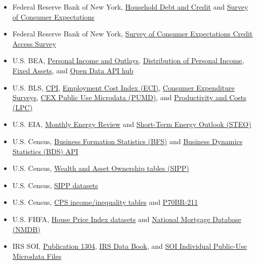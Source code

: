 \documentclass[11pt,openany]{book}
\begin{document}
\begin{itemize}
  \item Federal Reserve Bank of New York, \href{https://www.newyorkfed.org/microeconomics/hhdc}{Household Debt and Credit} and \href{https://www.newyorkfed.org/microeconomics/sce}{Survey of Consumer Expectations}
  \item Federal Reserve Bank of New York, \href{https://www.newyorkfed.org/microeconomics/sce/credit-access}{Survey of Consumer Expectations Credit Access Survey}
  \item U.S. BEA, \href{https://www.bea.gov/data/income-saving/personal-income}{Personal Income and Outlays}, \href{https://www.bea.gov/data/special-topics/distribution-of-personal-income}{Distribution of Personal Income}, \href{https://www.bea.gov/itable/fixed-assets}{Fixed Assets}, and \href{https://www.bea.gov/resources/developer-tools}{Open Data API hub}
  \item U.S. BLS, \href{https://www.bls.gov/cpi/home.htm}{CPI}, \href{https://www.bls.gov/eci/}{Employment Cost Index (ECI)}, \href{https://www.bls.gov/cex/}{Consumer Expenditure Surveys}, \href{https://www.bls.gov/cex/pumd.htm}{CEX Public Use Microdata (PUMD)}, and \href{https://www.bls.gov/lpc/}{Productivity and Costs (LPC)}
  \item U.S. EIA, \href{https://www.eia.gov/totalenergy/data/monthly/previous.php}{Monthly Energy Review} and \href{https://www.eia.gov/outlooks/steo/index.php}{Short-Term Energy Outlook (STEO)}
  \item U.S. Census, \href{https://www.census.gov/econ/bfs/index.html}{Business Formation Statistics (BFS)} and \href{https://www.census.gov/topics/business-economy/dynamics/data/api.html}{Business Dynamics Statistics (BDS) API}
  \item U.S. Census, \href{https://www.census.gov/topics/income-poverty/wealth/data/tables.html}{Wealth and Asset Ownership tables (SIPP)}
  \item U.S. Census, \href{https://www.census.gov/programs-surveys/sipp/data/datasets.html}{SIPP datasets}
  \item U.S. Census, \href{https://www.census.gov/topics/income-poverty/income-inequality/data/data-tables/cps-data-tables.html}{CPS income/inequality tables} and \href{https://www2.census.gov/library/publications/2025/demo/p70br-211.pdf}{P70BR-211}
  \item U.S. FHFA, \href{https://www.fhfa.gov/house-price-index}{House Price Index datasets} and \href{https://www.fhfa.gov/data/nmdb}{National Mortgage Database (NMDB)}
  \item IRS SOI, \href{https://www.irs.gov/statistics/soi-tax-stats-individual-income-tax-returns-complete-report-publication-1304}{Publication 1304}, \href{https://www.irs.gov/statistics/soi-tax-stats-irs-data-book}{IRS Data Book}, and \href{https://www.irs.gov/statistics/soi-tax-stats-individual-public-use-microdata-files}{SOI Individual Public-Use Microdata Files}

\end{itemize}
\end{document}

